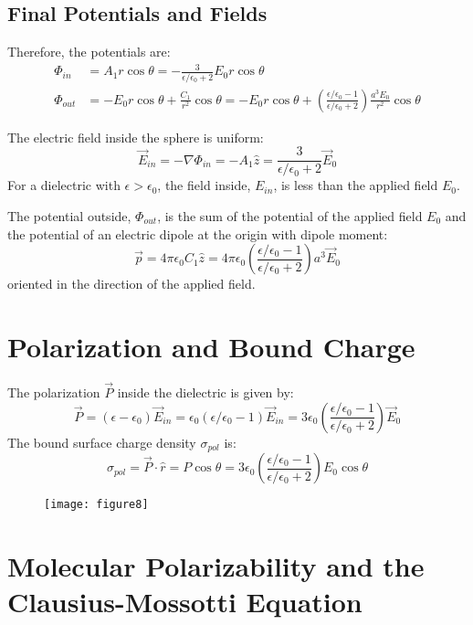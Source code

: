 \documentclass{article}
\begin{document}
	\subsection{Final Potentials and Fields}
	Therefore, the potentials are:
	\begin{align}
		\Phi_{in} &= A_1 r \cos\theta = -\frac{3}{\epsilon/\epsilon_0 + 2} E_0 r \cos\theta \\
		\Phi_{out} &= -E_0 r \cos\theta + \frac{C_1}{r^2}\cos\theta = -E_0 r \cos\theta + \left( \frac{\epsilon/\epsilon_0 - 1}{\epsilon/\epsilon_0 + 2} \right) \frac{a^3 E_0}{r^2} \cos\theta
	\end{align}
	
	The electric field inside the sphere is uniform:
	\[
	\vec{E}_{in} = -\nabla \Phi_{in} = -A_1 \hat{z} = \frac{3}{\epsilon/\epsilon_0 + 2} \vec{E}_0
	\]
	For a dielectric with $\epsilon > \epsilon_0$, the field inside, $E_{in}$, is less than the applied field $E_0$.
	
	The potential outside, $\Phi_{out}$, is the sum of the potential of the applied field $E_0$ and the potential of an electric dipole at the origin with dipole moment:
	\[
	\vec{p} = 4\pi\epsilon_0 C_1 \hat{z} = 4\pi\epsilon_0 \left( \frac{\epsilon/\epsilon_0 - 1}{\epsilon/\epsilon_0 + 2} \right) a^3 \vec{E}_0
	\]
	oriented in the direction of the applied field.
	
	\section{Polarization and Bound Charge}
	The polarization $\vec{P}$ inside the dielectric is given by:
	\[
	\vec{P} = (\epsilon - \epsilon_0)\vec{E}_{in} = \epsilon_0(\epsilon/\epsilon_0 - 1) \vec{E}_{in} = 3\epsilon_0 \left( \frac{\epsilon/\epsilon_0 - 1}{\epsilon/\epsilon_0 + 2} \right) \vec{E}_0
	\]
	The bound surface charge density $\sigma_{pol}$ is:
	\[
	\sigma_{pol} = \vec{P} \cdot \hat{r} = P \cos\theta = 3\epsilon_0 \left( \frac{\epsilon/\epsilon_0 - 1}{\epsilon/\epsilon_0 + 2} \right) E_0 \cos\theta
	\]
	
	\begin{figure}[h]
		\centering
		\texttt{[image: figure8]}
		\caption{}
		\label{fig:figure8}
	\end{figure}
	
	\section{Molecular Polarizability and the Clausius-Mossotti Equation}
	
\end{document}
